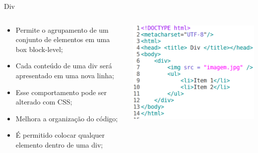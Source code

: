 \documentclass{beamer}
\begin{document}
\begin{frame}{Div}
  \begin{columns}
    \begin{column}{0.45 \textwidth}
      \small
     \begin{itemize}
       \item Permite o agrupamento de um conjunto de elementos em uma
box block-level;
       \item Cada conteúdo de uma div será apresentado em uma nova
linha;
       \item Esse comportamento pode ser alterado com CSS;
       \item Melhora a organização do código;
       \item É permitido colocar qualquer elemento dentro de uma div;
     \end{itemize}
    \end{column}
    
    \begin{column}{0.5\textwidth}
     \includegraphics[height=0.5\paperheight]{fig/aula2/html14.png}
    \end{column}
  \end{columns}
\end{frame}
\end{document}
